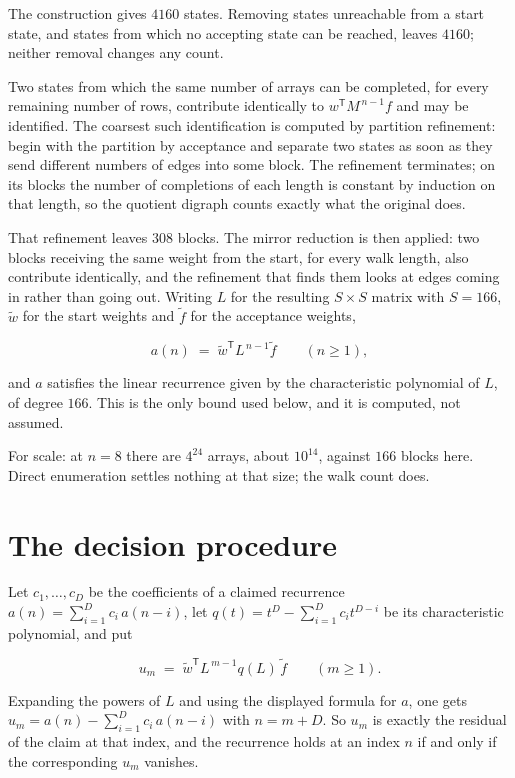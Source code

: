 \documentclass[11pt]{article}
\theoremstyle{definition}
\begin{document}
The construction gives $4160$ states. Removing states unreachable from a start state, and states from which no accepting state can be reached, leaves $4160$; neither removal changes any count.

Two states from which the same number of arrays can be completed, for every remaining number of rows, contribute identically to $w^{\mathsf T}M^{\,n-1}f$ and may be identified. The coarsest such identification is computed by partition refinement: begin with the partition by acceptance and separate two states as soon as they send different numbers of edges into some block. The refinement terminates; on its blocks the number of completions of each length is constant by induction on that length, so the quotient digraph counts exactly what the original does.

That refinement leaves $308$ blocks. The mirror reduction is then applied: two blocks receiving the same weight from the start, for every walk length, also contribute identically, and the refinement that finds them looks at edges coming in rather than going out. Writing $L$ for the resulting $S \times S$ matrix with $S = 166$, $\tilde w$ for the start weights and $\tilde f$ for the acceptance weights,

\[a(n) \;=\; \tilde w^{\mathsf T} L^{\,n-1} \tilde f \qquad (n \ge 1),\]

and $a$ satisfies the linear recurrence given by the characteristic polynomial of $L$, of degree $166$. This is the only bound used below, and it is computed, not assumed.

For scale: at $n = 8$ there are $4^{24}$ arrays, about $10^{14}$, against $166$ blocks here. Direct enumeration settles nothing at that size; the walk count does.

\section{The decision procedure}

Let $c_1,\dots,c_D$ be the coefficients of a claimed recurrence $a(n) = \sum_{i=1}^{D} c_i\,a(n-i)$, let $q(t) = t^{D} - \sum_{i=1}^{D} c_i t^{D-i}$ be its characteristic polynomial, and put

\[u_m \;=\; \tilde w^{\mathsf T} L^{\,m-1} q(L)\,\tilde f \qquad (m \ge 1).\]

Expanding the powers of $L$ and using the displayed formula for $a$, one gets $u_m = a(n) - \sum_{i=1}^{D} c_i\,a(n-i)$ with $n = m + D$. So $u_m$ is exactly the residual of the claim at that index, and the recurrence holds at an index $n$ if and only if the corresponding $u_m$ vanishes.
\end{document}
